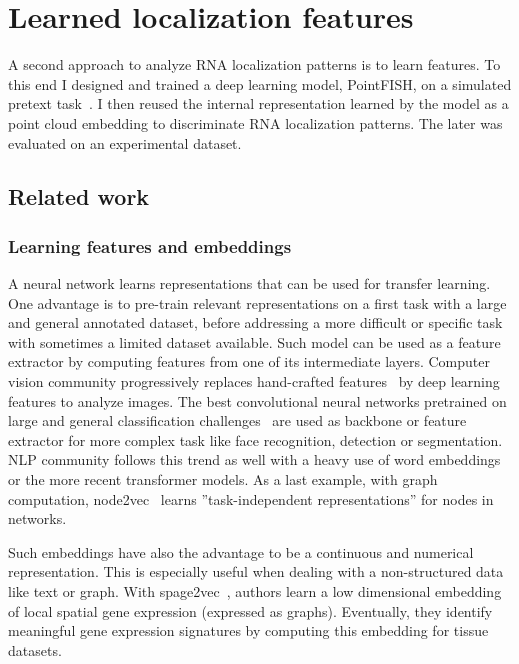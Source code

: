 \section{Learned localization features}
\label{sec:learned_features}

A second approach to analyze \ac{RNA} localization patterns is to learn features.
To this end I designed and trained a deep learning model, PointFISH, on a simulated pretext task~\cite{pointfish_2022}.
I then reused the internal representation learned by the model as a point cloud embedding to discriminate \ac{RNA} localization patterns.
The later was evaluated on an experimental dataset.

\subsection{Related work}
\label{subsec:related_work_learned_features}

\subsubsection{Learning features and embeddings}

A neural network learns representations that can be used for transfer learning.
One advantage is to pre-train relevant representations on a first task with a large and general annotated dataset, before addressing a more difficult or specific task with sometimes a limited dataset available.
Such model can be used as a feature extractor by computing features from one of its intermediate layers.
Computer vision community progressively replaces hand-crafted features~\cite{Lowe_1999,Bay_2006} by deep learning features to analyze images.
The best convolutional neural networks pretrained on large and general classification challenges~\cite{He_2016_CVPR,Szegedy_2016_CVPR,Tan_2019,Huang_2017_CVPR} are used as backbone or feature extractor for more complex task like face recognition, detection or segmentation.
NLP community follows this trend as well with a heavy use of word embeddings~\cite{Mikolov_2013,Joulin_2016} or the more recent transformer models.
As a last example, with graph computation, node2vec~\cite{Grover_2016} learns ''task-independent representations'' for nodes in networks.

Such embeddings have also the advantage to be a continuous and numerical representation.
This is especially useful when dealing with a non-structured data like text or graph.
With spage2vec~\cite{Partel_2021}, authors learn a low dimensional embedding of local spatial gene expression (expressed as graphs).
Eventually, they identify meaningful gene expression signatures by computing this embedding for tissue datasets.


